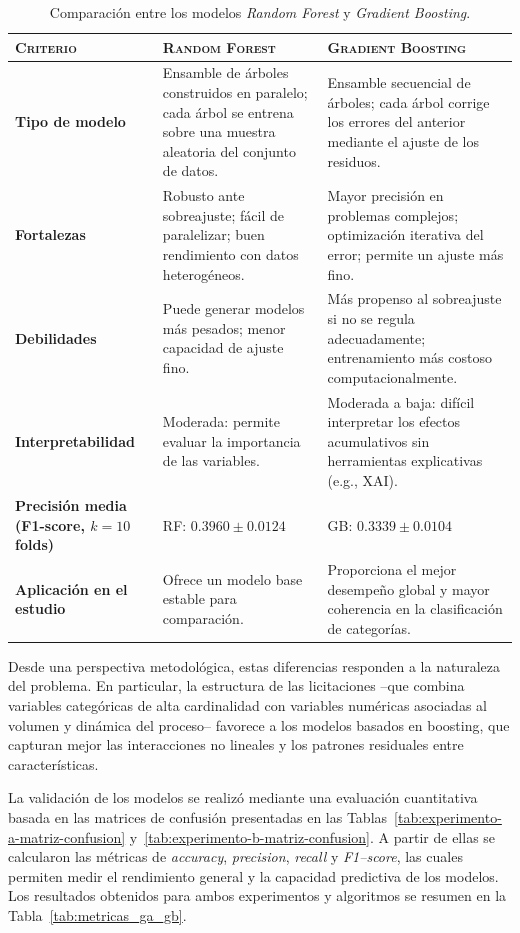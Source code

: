 \documentclass[a4paper,fleqn]{cas-sc}
\begin{document}
 \begin{table}[ht]
 	\centering
 	\caption{Comparación entre los modelos \textit{Random Forest} y \textit{Gradient Boosting}.}
 	\label{tab:comparacion_modelos}
 	\setlength{\tabcolsep}{7pt}
 	\begin{tabular}{p{2.5cm} p{4cm} p{5cm}}
 		\toprule
 		\textbf{\textsc{Criterio}} & \textbf{\textsc{Random Forest}} & \textbf{\textsc{Gradient Boosting}} \\
 		\midrule
 		\textbf{Tipo de modelo} & Ensamble de árboles construidos en paralelo; cada árbol se entrena sobre una muestra aleatoria del conjunto de datos. & Ensamble secuencial de árboles; cada árbol corrige los errores del anterior mediante el ajuste de los residuos. \\
 		\textbf{Fortalezas} & Robusto ante sobreajuste; fácil de paralelizar; buen rendimiento con datos heterogéneos. & Mayor precisión en problemas complejos; optimización iterativa del error; permite un ajuste más fino. \\
 		\textbf{Debilidades} & Puede generar modelos más pesados; menor capacidad de ajuste fino. & Más propenso al sobreajuste si no se regula adecuadamente; entrenamiento más costoso computacionalmente. \\
 		\textbf{Interpretabilidad} & Moderada: permite evaluar la importancia de las variables. & Moderada a baja: difícil interpretar los efectos acumulativos sin herramientas explicativas (e.g., XAI). \\
 		\textbf{Precisión media (F1-score, $k=10$ folds)} & RF: $0.3960 \pm 0.0124$ & GB: $0.3339 \pm 0.0104$ \\
 		\textbf{Aplicación en el estudio} & Ofrece un modelo base estable para comparación. & Proporciona el mejor desempeño global y mayor coherencia en la clasificación de categorías. \\
 		\bottomrule
 	\end{tabular}
 \end{table}
 
 
 	Desde una perspectiva metodológica, estas diferencias responden a la naturaleza del problema. En particular, la estructura de las licitaciones --que combina variables categóricas de alta cardinalidad con variables numéricas asociadas al volumen y dinámica del proceso-- favorece a los modelos basados en boosting, que capturan mejor las interacciones no lineales y los patrones residuales entre características.
 
 
 
 	La validación de los modelos se realizó mediante una evaluación cuantitativa basada en las matrices de confusión presentadas en las Tablas~\ref{tab:experimento-a-matriz-confusion} y~\ref{tab:experimento-b-matriz-confusion}. 
 	A partir de ellas se calcularon las métricas de \textit{accuracy}, \textit{precision}, \textit{recall} y \textit{F1--score}, las cuales permiten medir el rendimiento general y la capacidad predictiva de los modelos. 
 	Los resultados obtenidos para ambos experimentos y algoritmos se resumen en la Tabla~\ref{tab:metricas_ga_gb}.
 
\end{document}
